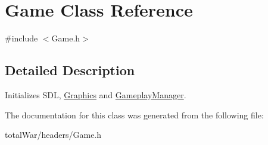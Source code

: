 \hypertarget{class_game}{}\section{Game Class Reference}
\label{class_game}


{\ttfamily \#include $<$Game.\+h$>$}



\subsection{Detailed Description}
Initializes S\+DL, \hyperlink{class_graphics}{Graphics} and \hyperlink{class_gameplay_manager}{Gameplay\+Manager}. 

The documentation for this class was generated from the following file\+:\begin{DoxyCompactItemize}
\item 
total\+War/headers/Game.\+h\end{DoxyCompactItemize}

